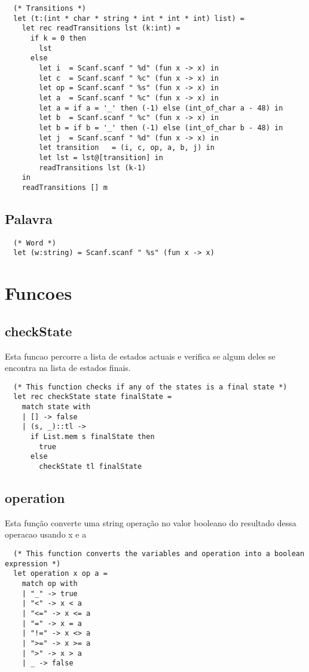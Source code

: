 \documentclass[11pt]{article}
\begin{document}
\begin{verbatim}
  (* Transitions *)
  let (t:(int * char * string * int * int * int) list) =
    let rec readTransitions lst (k:int) =
      if k = 0 then
        lst
      else
        let i  = Scanf.scanf " %d" (fun x -> x) in
        let c  = Scanf.scanf " %c" (fun x -> x) in
        let op = Scanf.scanf " %s" (fun x -> x) in
        let a  = Scanf.scanf " %c" (fun x -> x) in
        let a = if a = '_' then (-1) else (int_of_char a - 48) in
        let b  = Scanf.scanf " %c" (fun x -> x) in
        let b = if b = '_' then (-1) else (int_of_char b - 48) in
        let j  = Scanf.scanf " %d" (fun x -> x) in
        let transition   = (i, c, op, a, b, j) in
        let lst = lst@[transition] in
        readTransitions lst (k-1)
    in
    readTransitions [] m
\end{verbatim}
\subsection{Palavra}
\label{sec:org1bc1ac7}
\begin{verbatim}
  (* Word *)
  let (w:string) = Scanf.scanf " %s" (fun x -> x)
\end{verbatim}
\section{Funcoes}
\label{sec:org392fd03}
\subsection{checkState}
\label{sec:org99cdc24}
Esta funcao percorre a lista de estados actuais e verifica se algum deles se encontra na lista de estados finais.
\begin{verbatim}
  (* This function checks if any of the states is a final state *)
  let rec checkState state finalState =
    match state with
    | [] -> false
    | (s, _)::tl ->
      if List.mem s finalState then
        true
      else
        checkState tl finalState
\end{verbatim}
\subsection{operation}
\label{sec:orge4717f0}
Esta função converte uma string operação no valor booleano do resultado dessa operacao usando x e a
\begin{verbatim}
  (* This function converts the variables and operation into a boolean expression *)
  let operation x op a =
    match op with
    | "_" -> true
    | "<" -> x < a
    | "<=" -> x <= a
    | "=" -> x = a
    | "!=" -> x <> a
    | ">=" -> x >= a
    | ">" -> x > a
    | _ -> false
\end{verbatim}
\pagebreak{}
\end{document}

